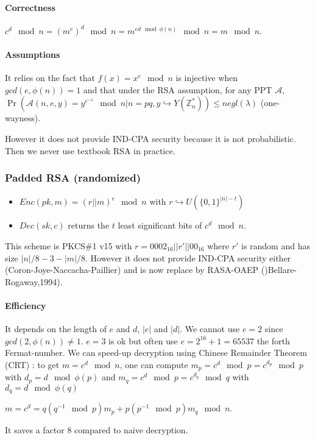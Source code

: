 \documentclass{article}
\newcommand{\Z}{\mathbb{Z}}
\newcommand{\A}{\mathcal{A}}
\newcommand{\bit}{\{0,1\}}
\begin{document}
\paragraph{Correctness} $c^d\mod{n}=(m^e)^d\mod{n}=m^{ed\mod{\phi(n)}}\mod{n}=m\mod{n}$.

\paragraph{Assumptions} It relies on the fact that $f(x)=x^e\mod{n}$ is injective when $gcd(e,\phi(n))=1$ and that under the RSA assumption, for any PPT $\A$, $\Pr(\A(n,e,y)=y^{e^{-1}} \mod{n}|n=pq, y\hookrightarrow Y(\Z_n^*))\leq negl(\lambda)$ (one-wayness).

However it does not provide IND-CPA security because it is not probabilistic. Then we never use textbook RSA in practice.

\subsubsection{Padded RSA (randomized)}
\begin{itemize}
\item $Enc(pk,m)=(r||m)^e\mod{n}$ with $r\hookrightarrow U(\bit^{|n|-t})$
\item $Dec(sk,c)$ returns the $t$ least significant bits of $c^d\mod{n}$.
\end{itemize}

This scheme is PKCS\#1 v15 with $r=0002_{16}||r'||00_{16}$ where $r'$ is random and has size $|n|/8-3-|m|/8$. However it does not provide IND-CPA security either (Coron-Joye-Naccacha-Paillier) and is now replace by RASA-OAEP ()Bellare-Rogaway,1994).

\paragraph{Efficiency} It depends on the length of $e$ and $d$, $|e|$ and $|d|$. We cannot use $e=2$ since $gcd(2,\phi(n))\neq 1$. $e=3$ is ok but often use $e=2^16+1=65537$ the forth Fermat-number. We can speed-up decryption using Chinese Remainder Theorem (CRT) : to get $m=c^d\mod{n}$, one can compute $m_p=c^d\mod{p}=c^{d_p}\mod{p}$ with $d_p=d\mod{\phi(p)}$ and $m_q=c^d\mod{p}=c^{d_q}\mod{q}$ with $d_q=d\mod{\phi(q)}$

$m=c^d=q(q^{-1}\mod{p})m_p + p(p^{-1}\mod{p})m_q\mod{n}$. 

It saves a factor $8$ compared to naive decryption. 
\end{document}
